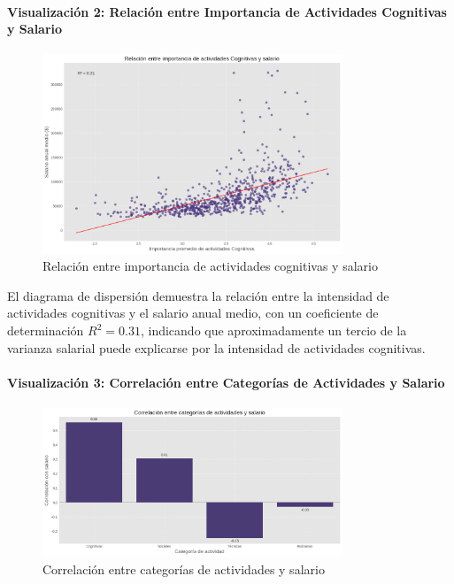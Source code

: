 \documentclass{article}
\theoremstyle{remark}
\theoremstyle{definition}
\begin{document}
\begin{tcolorbox}
\paragraph{Visualización 2: Relación entre Importancia de Actividades Cognitivas y Salario}
\begin{figure}[H]
    \centering
    \includegraphics[width=0.8\textwidth]{views/entrega1/relacion_cognitivas_salario.png}
    \caption{Relación entre importancia de actividades cognitivas y salario}
    \label{fig:cognitivas_salario}
\end{figure}

El diagrama de dispersión demuestra la relación entre la intensidad de actividades cognitivas y el salario anual medio, con un coeficiente de determinación $R^2 = 0.31$, indicando que aproximadamente un tercio de la varianza salarial puede explicarse por la intensidad de actividades cognitivas.

\paragraph{Visualización 3: Correlación entre Categorías de Actividades y Salario}
\begin{figure}[H]
    \centering
    \includegraphics[width=0.8\textwidth]{views/entrega1/correlacion_categorias}
    \caption{Correlación entre categorías de actividades y salario}
    \label{fig:corr_categorias}
\end{figure}


\end{tcolorbox}
\end{document}
